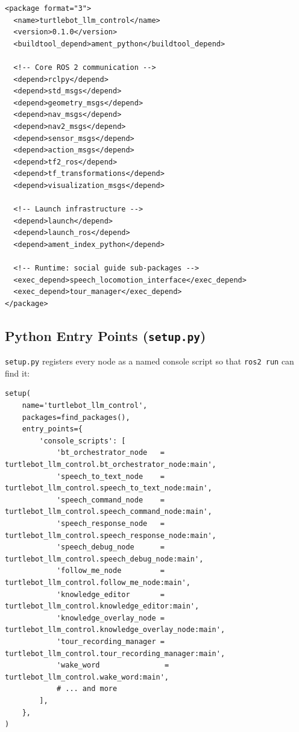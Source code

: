\documentclass[12pt,a4paper]{report}
\begin{document}
\begin{lstlisting}[style=xmlstyle, caption={Key sections of \texttt{package.xml}}]
<package format="3">
  <name>turtlebot_llm_control</name>
  <version>0.1.0</version>
  <buildtool_depend>ament_python</buildtool_depend>

  <!-- Core ROS 2 communication -->
  <depend>rclpy</depend>
  <depend>std_msgs</depend>
  <depend>geometry_msgs</depend>
  <depend>nav_msgs</depend>
  <depend>nav2_msgs</depend>
  <depend>sensor_msgs</depend>
  <depend>action_msgs</depend>
  <depend>tf2_ros</depend>
  <depend>tf_transformations</depend>
  <depend>visualization_msgs</depend>

  <!-- Launch infrastructure -->
  <depend>launch</depend>
  <depend>launch_ros</depend>
  <depend>ament_index_python</depend>

  <!-- Runtime: social guide sub-packages -->
  <exec_depend>speech_locomotion_interface</exec_depend>
  <exec_depend>tour_manager</exec_depend>
</package>
\end{lstlisting}

\subsection{Python Entry Points (\texttt{setup.py})}

\texttt{setup.py} registers every node as a named console script so that
\texttt{ros2~run} can find it:

\begin{lstlisting}[style=pythonstyle, caption={Excerpt showing entry-point registration pattern}]
setup(
    name='turtlebot_llm_control',
    packages=find_packages(),
    entry_points={
        'console_scripts': [
            'bt_orchestrator_node   = turtlebot_llm_control.bt_orchestrator_node:main',
            'speech_to_text_node    = turtlebot_llm_control.speech_to_text_node:main',
            'speech_command_node    = turtlebot_llm_control.speech_command_node:main',
            'speech_response_node   = turtlebot_llm_control.speech_response_node:main',
            'speech_debug_node      = turtlebot_llm_control.speech_debug_node:main',
            'follow_me_node         = turtlebot_llm_control.follow_me_node:main',
            'knowledge_editor       = turtlebot_llm_control.knowledge_editor:main',
            'knowledge_overlay_node = turtlebot_llm_control.knowledge_overlay_node:main',
            'tour_recording_manager = turtlebot_llm_control.tour_recording_manager:main',
            'wake_word               = turtlebot_llm_control.wake_word:main',
            # ... and more
        ],
    },
)
\end{lstlisting}
\end{document}
